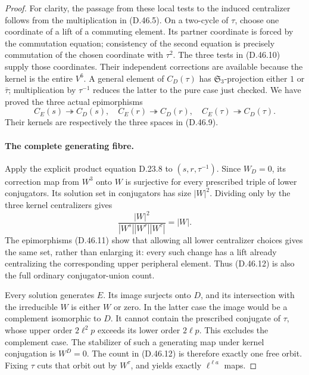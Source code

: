 \begin{proof}
For clarity, the passage from these local tests to the
induced centralizer follows from the multiplication in
\textup{(D.46.5)}. On a two-cycle of \(\tau\), choose
one coordinate of a lift of a commuting element. Its
partner coordinate is forced by the commutation equation;
consistency of the second equation is precisely commutation
of the chosen coordinate with \(\tau^2\).
The three tests in \textup{(D.46.10)} supply those coordinates.
Their independent corrections are available because the
kernel is the entire \(V^6\). A general element of
\(C_D(\tau)\) has \(\mathfrak S_3\)-projection either
\(1\) or \(\bar\tau\); multiplication by \(\tau^{-1}\)
reduces the latter to the pure case just checked.
We have proved the three actual epimorphisms
\[
 C_E(s)\twoheadrightarrow C_D(s),\quad
 C_E(r)\twoheadrightarrow C_D(r),\quad
 C_E(\tau)\twoheadrightarrow C_D(\tau).
 \tag{D.46.11}
\]
Their kernels are respectively the three spaces in
\textup{(D.46.9)}.

\paragraph{The complete generating fibre.}
Apply the explicit product equation D.23.8 to
\((s,r,\tau^{-1})\). Since \(W_D=0\), its correction
map from \(W^3\) onto \(W\) is surjective for every
prescribed triple of lower conjugators.
Its solution set in conjugators has size \(|W|^2\).
Dividing only by the three kernel centralizers gives
\[
 \frac{|W|^2}{|W^s||W^r||W^\tau|}=|W|.
 \tag{D.46.12}
\]
The epimorphisms \textup{(D.46.11)} show that allowing
all lower centralizer choices gives the same set, rather
than enlarging it: every such change has a lift already
centralizing the corresponding upper peripheral element.
Thus \textup{(D.46.12)} is also the full ordinary
conjugator-union count.

Every solution generates \(E\). Its image surjects onto
\(D\), and its intersection with the irreducible \(W\)
is either \(W\) or zero. In the latter case the image
would be a complement isomorphic to \(D\). It cannot
contain the prescribed conjugate of \(\tau\), whose
upper order \(2\ell^2p\) exceeds its lower order
\(2\ell p\). This excludes the complement case.
The stabilizer of such a generating map under kernel
conjugation is \(W^D=0\). The count in
\textup{(D.46.12)} is therefore exactly one free orbit.
Fixing \(\tau\) cuts that orbit out by \(W^\tau\),
and yields exactly \(\ell^{\ell a}\) maps.


\end{proof}
